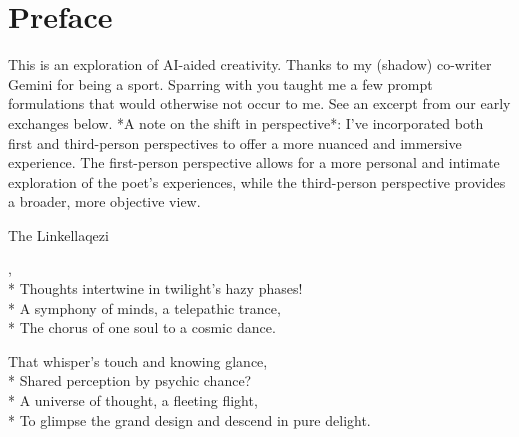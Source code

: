 \documentclass[12pt]{book}
\begin{document}
    \maketitle
    \makededication

    \frontmatter

    \maketoc

    \renewcommand*{\topname}{Poems} %
    \maketop

    \section{Preface}
    This is an exploration of AI-aided creativity.
    Thanks to my (shadow) co-writer Gemini for being a sport. Sparring with you taught me a few
    prompt formulations that would otherwise not occur to me. See an excerpt from our early exchanges below.
    *A note on the shift in perspective*: I've incorporated both first and third-person perspectives to offer a more
    nuanced and immersive experience. The first-person perspective allows for a more personal and intimate exploration
    of the poet's experiences, while the third-person perspective provides a broader, more objective view.

    \newpage
    \thispagestyle{empty}

    \mainmatter

    \begin{poem}{The Link}{ellaqezi}

        \settowidth{\versewidth}{To glimpse the grand design and descend in pure delight.}

        \begin{altverse}
            ,\\*
            Thoughts intertwine in twilight's hazy phases!\\*
            A symphony of minds, a telepathic trance,\\*
            The chorus of one soul to a cosmic dance.
        \end{altverse}

        \begin{altverse}
            That whisper's touch and knowing glance,\\*
            Shared perception by psychic chance?\\*
            A universe of thought, a fleeting flight,\\*
            To glimpse the grand design and descend in pure delight.
        \end{altverse}

    \end{poem}
\end{document}
